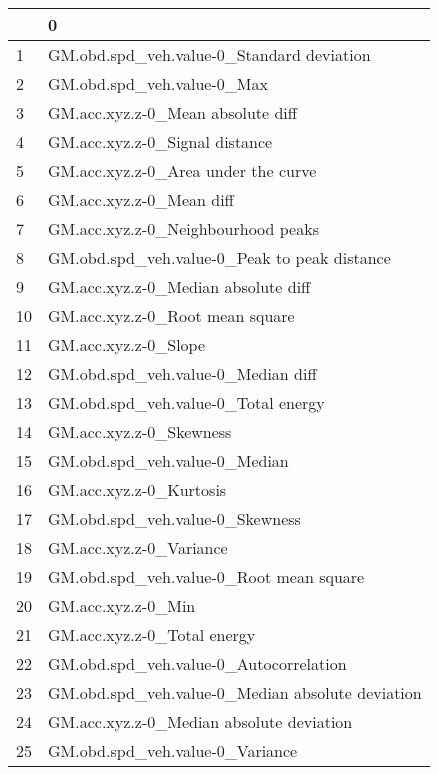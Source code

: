 \begin{tabular}{ll}
\toprule
{} &                                                 0 \\
\midrule
1  &         GM.obd.spd\_veh.value-0\_Standard deviation \\
2  &                        GM.obd.spd\_veh.value-0\_Max \\
3  &                 GM.acc.xyz.z-0\_Mean absolute diff \\
4  &                    GM.acc.xyz.z-0\_Signal distance \\
5  &               GM.acc.xyz.z-0\_Area under the curve \\
6  &                          GM.acc.xyz.z-0\_Mean diff \\
7  &                GM.acc.xyz.z-0\_Neighbourhood peaks \\
8  &      GM.obd.spd\_veh.value-0\_Peak to peak distance \\
9  &               GM.acc.xyz.z-0\_Median absolute diff \\
10 &                   GM.acc.xyz.z-0\_Root mean square \\
11 &                              GM.acc.xyz.z-0\_Slope \\
12 &                GM.obd.spd\_veh.value-0\_Median diff \\
13 &               GM.obd.spd\_veh.value-0\_Total energy \\
14 &                           GM.acc.xyz.z-0\_Skewness \\
15 &                     GM.obd.spd\_veh.value-0\_Median \\
16 &                           GM.acc.xyz.z-0\_Kurtosis \\
17 &                   GM.obd.spd\_veh.value-0\_Skewness \\
18 &                           GM.acc.xyz.z-0\_Variance \\
19 &           GM.obd.spd\_veh.value-0\_Root mean square \\
20 &                                GM.acc.xyz.z-0\_Min \\
21 &                       GM.acc.xyz.z-0\_Total energy \\
22 &            GM.obd.spd\_veh.value-0\_Autocorrelation \\
23 &  GM.obd.spd\_veh.value-0\_Median absolute deviation \\
24 &          GM.acc.xyz.z-0\_Median absolute deviation \\
25 &                   GM.obd.spd\_veh.value-0\_Variance \\

\end{tabular}
